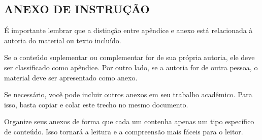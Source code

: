 
\begin{anexosenv}
    \partanexos


    \chapter{ANEXO DE INSTRUÇÃO}
    \label{anexo_a}

    É importante lembrar que a distinção entre apêndice e anexo está relacionada à autoria do material ou texto incluído.

    Se o conteúdo suplementar ou complementar for de sua própria autoria, ele deve ser classificado como apêndice. Por outro lado, se a autoria for de outra pessoa, o material deve ser apresentado como anexo.

    Se necessário, você pode incluir outros anexos em seu trabalho acadêmico. Para isso, basta copiar e colar este trecho no mesmo documento.

    Organize seus anexos de forma que cada um contenha apenas um tipo específico de conteúdo. Isso tornará a leitura e a compreensão mais fáceis para o leitor.
    
\end{anexosenv}